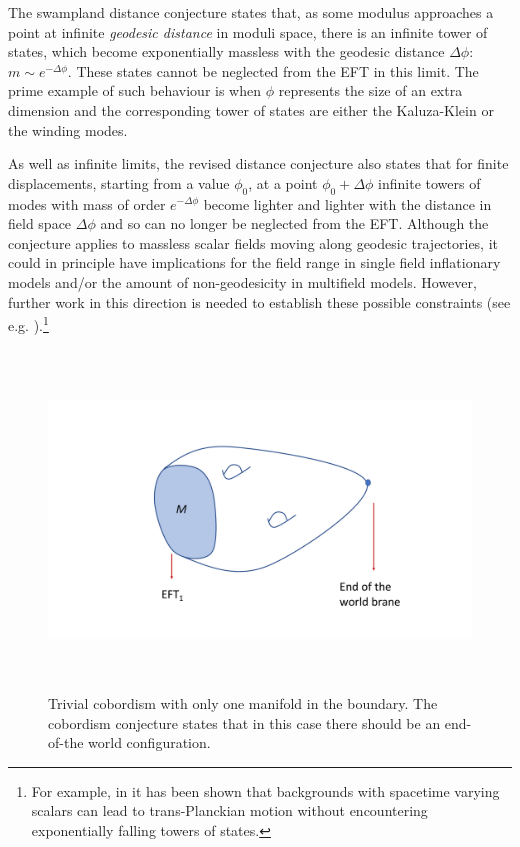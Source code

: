 \begin{enumerate}
The swampland distance conjecture states that,  as some modulus approaches a point at infinite {\em geodesic distance} in moduli space, there is an infinite tower of states, which become exponentially massless with the geodesic distance $\Delta\phi$: $m\sim e^{-\Delta\phi}$. These states cannot be neglected from the EFT in this limit. The prime example of such behaviour is when $\phi$ represents the size of an extra dimension and the corresponding tower of states are either the Kaluza-Klein or the winding modes.

As well as infinite limits, the revised distance conjecture also states that for finite displacements, starting from a value $\phi_0$, at a point $\phi_0+\Delta \phi$ infinite towers of modes with mass of order $e^{-\Delta\phi}$ become lighter and lighter with the distance in field space $\Delta\phi$ and so can no longer be neglected from the EFT. Although the conjecture applies to massless scalar fields moving along geodesic trajectories, it could in principle have implications for the field range in single field inflationary models and/or the amount of non-geodesicity in multifield models. However, further work in this direction is needed to establish these possible constraints (see e.g. \cite{Kinney:2018nny, Kinney:2018kew, Palti:2019pca,vanBeest:2021lhn,Grana:2021zvf}).\footnote{ For example, in  \cite{Buratti:2018xjt} it has been shown  that  backgrounds with spacetime varying scalars can  lead to trans-Planckian motion without encountering exponentially falling towers of states. }
 

\begin{figure}[t]
\begin{center}
\includegraphics[width=140mm,height=90mm]{Sections/Figures/Cobordism2.pdf} 
\vskip -15pt
\caption{Trivial cobordism with only one manifold in the boundary. The cobordism conjecture states that in this case there should be an end-of-the world configuration.} \label{cobordism2}
\end{center}
\end{figure}



\end{enumerate}
